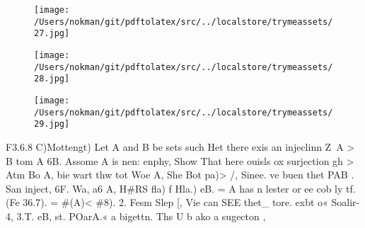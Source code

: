 \documentclass[a4paper,12pt]{article}
\begin{document}
\par

\vspace{10pt}

\begin{figure}[h]

\texttt{[image: /Users/nokman/git/pdftolatex/src/../localstore/trymeassets/27.jpg]}

\centering

\end{figure}

\par

\vspace{10pt}

\begin{figure}[h]

\texttt{[image: /Users/nokman/git/pdftolatex/src/../localstore/trymeassets/28.jpg]}

\centering

\end{figure}

\par

\vspace{10pt}

\begin{figure}[h]

\texttt{[image: /Users/nokman/git/pdftolatex/src/../localstore/trymeassets/29.jpg]}

\centering

\end{figure}

\par

\vspace{10pt}

    F3.6.8 C)Mottengt)   Let A and B be sets such Het there exis an injeclinn Z~A > B tom A 6B.  Assome A is nen: enphy, Show That here ouisls ox surjection gh > Atm Bo A,  bie wart thw tot Woe A, She Bot pa)>    /, Sinee. ve buen thet PAB . San inject, 6F.  Wa, a6 A, H\#RS fla) f Hla.) eB.  = A has n lester or ee cob ly tf. (Fe 36.7).  = \#(A)< \#8).    2. Fesm Slep [, Vie can SEE thet\_ tore. exbt o« Soalir- 4, 3.T.  eB, st. POarA.« a bigettn.  Ths U b ako a sugecton , 

\vspace{10pt}

\par

\vspace{10pt}
\end{document}
